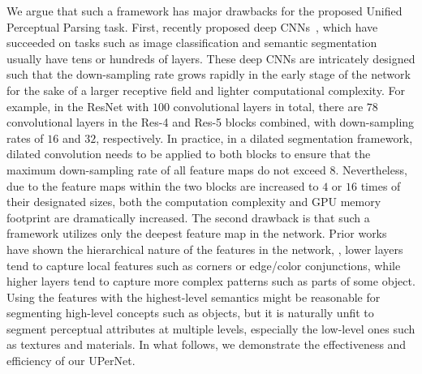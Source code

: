 \documentclass[runningheads]{llncs}
\begin{document}
We argue that such a framework has major drawbacks for the proposed Unified Perceptual Parsing task. First, recently proposed deep CNNs~\cite{he2016deep,xie2017aggregated}, which have succeeded on tasks such as image classification and semantic segmentation usually have tens or hundreds of layers. These deep CNNs are intricately designed such that the down-sampling rate grows rapidly in the early stage of the network for the sake of a larger receptive field and lighter computational complexity. For example, in the ResNet with $100$ convolutional layers in total, there are $78$ convolutional layers in the Res-4 and Res-5 blocks combined, with down-sampling rates of $16$ and $32$, respectively. In practice, in a dilated segmentation framework, dilated convolution needs to be applied to both blocks to ensure that the maximum down-sampling rate of all feature maps do not exceed 8. Nevertheless, due to the feature maps within the two blocks are increased to $4$ or $16$ times of their designated sizes, both the computation complexity and GPU memory footprint are dramatically increased. The second drawback is that such a framework utilizes only the deepest feature map in the network. Prior works~\cite{zeiler2014visualizing} have shown the hierarchical nature of the features in the network, \ie, lower layers tend to capture local features such as corners or edge/color conjunctions, while higher layers tend to capture more complex patterns such as parts of some object. Using the features with the highest-level semantics might be reasonable for segmenting high-level concepts such as objects, but it is naturally unfit to segment perceptual attributes at multiple levels, especially the low-level ones such as textures and materials. In what follows, we demonstrate the effectiveness and efficiency of our UPerNet.
\end{document}
